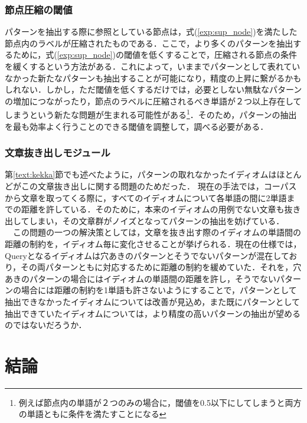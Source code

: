 \documentclass[12pt,twoside, fleqn]{ujbook}
\begin{document}
	\subsection{節点圧縮の閾値}
	\label{text:assyuku_mondai}
	パターンを抽出する際に参照としている節点は，式(\ref{exp:sup_node})を満たした節点内のラベルが圧縮されたものである．ここで，より多くのパターンを抽出するために，式(\ref{exp:sup_node})の閾値を低くすることで，圧縮される節点の条件を緩くするという方法がある．これによって，いままでパターンとして表れていなかった新たなパターンも抽出することが可能になり，精度の上昇に繋がるかもしれない．しかし，ただ閾値を低くするだけでは，必要としない無駄なパターンの増加につながったり，節点のラベルに圧縮されるべき単語が２つ以上存在してしまうという新たな問題が生まれる可能性がある\footnote{例えば節点内の単語が２つのみの場合に，閾値を0.5以下にしてしまうと両方の単語ともに条件を満たすことになる}．そのため，パターンの抽出を最も効率よく行うことのできる閾値を調整して，調べる必要がある．

	\subsection{文章抜き出しモジュール}
	第\ref{text:kekka}節でも述べたように，パターンの取れなかったイディオムはほとんどがこの文章抜き出しに関する問題のためだった．
	現在の手法では，コーパスから文章を取ってくる際に，すべてのイディオムについて各単語の間に2単語までの距離を許している．そのために，本来のイディオムの用例でない文章も抜き出してしまい，その文章群がノイズとなってパターンの抽出を妨げている．\\
	\ \ この問題の一つの解決策としては，文章を抜き出す際のイディオムの単語間の距離の制約を，イディオム毎に変化させることが挙げられる．現在の仕様では，Queryとなるイディオムは穴あきのパターンとそうでないパターンが混在しており，その両パターンともに対応するために距離の制約を緩めていた．それを，穴あきのパターンの場合にはイディオムの単語間の距離を許し，そうでないパターンの場合には距離の制約を1単語も許さないようにすることで，パターンとして抽出できなかったイディオムについては改善が見込め，また既にパターンとして抽出できていたイディオムについては，より精度の高いパターンの抽出が望めるのではないだろうか．



\chapter{結論}
\label{text:ketsuron}
\end{document}
